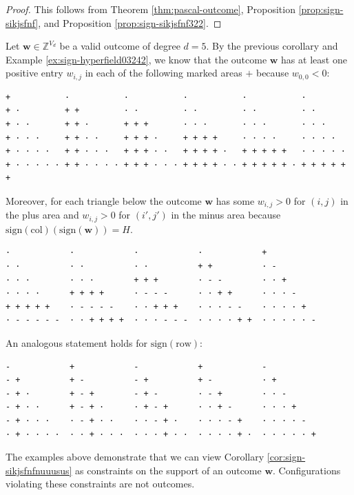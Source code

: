 \begin{proof}
    This follows from Theorem \ref{thm:pascal-outcome}, Proposition \ref{prop:sign-sikjsfnf}, and Proposition \ref{prop:sign-sikjsfnf322}.
\end{proof}

\begin{example}\label{ex:sjiu2ui3diag}
    Let \( \mathbf{w} \in \mathbb{Z}^{V_d} \) be a valid outcome of degree \( d = 5 \). By the previous corollary and Example \ref{ex:sign-hyperfield03242}, we know that the outcome \( \mathbf{w} \) has at least one positive entry \( w_{i,j} \) in each of the following marked areas \( + \) because \( w_{0,0} < 0 \):
    \begin{verbatim}
+           ·           ·           ·           ·           ·
+ ·         + +         · ·         · ·         · ·         · ·
+ · ·       + + ·       + + +       · · ·       · · ·       · · ·
+ · · ·     + + · ·     + + + ·     + + + +     · · · ·     · · · ·
+ · · · ·   + + · · ·   + + + · ·   + + + + ·   + + + + +   · · · · ·
+ · · · · · + + · · · · + + + · · · + + + + · · + + + + + · + + + + + +
    \end{verbatim}
    Moreover, for each triangle below the outcome \( \mathbf{w} \) has some \( w_{i,j} > 0 \) for \( (i,j) \) in the plus area and \( w_{i,j} > 0 \) for \( (i',j') \) in the minus area because \( \mathrm{sign}(\mathrm{col})(\mathrm{sign}(\mathbf{w})) = H \).
    \begin{verbatim}
·            ·            ·            ·            +
· ·          · ·          · ·          + +          · -
· · ·        · · ·        + + +        · - -        · · +
· · · ·      + + + +      · - - -      · · + +      · · · -
+ + + + +    · - - - -    · · + + +    · · · - -    · · · · +
· - - - - -  · · + + + +  · · · - - -  · · · · + +  · · · · · -
\end{verbatim}
    An analogous statement holds for \( \mathrm{sign}(\mathrm{row}) \):
    \begin{verbatim}
-            +            -            +            -
- +          + -          - +          + -          · +
- + ·        + - +        - + -        · - +        · · -
- + · ·      + - + ·      · + - +      · · + -      · · · +
- + · · ·    · - + · ·    · · - + ·    · · · - +    · · · · -
· + · · · ·  · · + · · ·  · · · + · ·  · · · · + ·  · · · · · +
    \end{verbatim}
\end{example}

The examples above demonstrate that we can view Corollary \ref{cor:sign-sikjsfnfnuuusus} as constraints on the support of an outcome \( \mathbf{w} \). Configurations violating these constraints are not outcomes.

